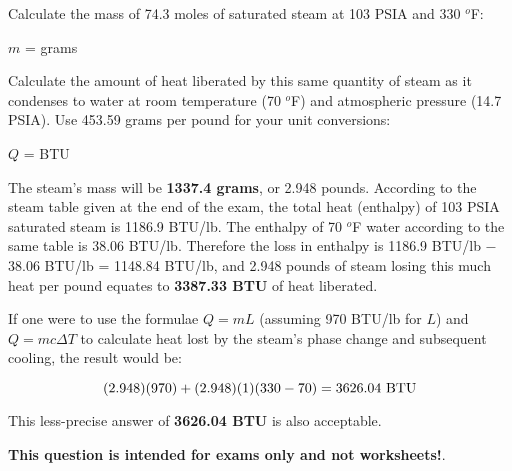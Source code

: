 

Calculate the mass of 74.3 moles of saturated steam at 103 PSIA and 330 $^{o}$F:

\vskip 10pt

$m$ = \underbar{\hskip 50pt} grams

\vskip 20pt

Calculate the amount of heat liberated by this same quantity of steam as it condenses to water at room temperature (70 $^{o}$F) and atmospheric pressure (14.7 PSIA).  Use 453.59 grams per pound for your unit conversions:

\vskip 10pt

$Q$ = \underbar{\hskip 50pt} BTU







The steam's mass will be {\bf 1337.4 grams}, or 2.948 pounds.  According to the steam table given at the end of the exam, the total heat (enthalpy) of 103 PSIA saturated steam is 1186.9 BTU/lb.  The enthalpy of 70 $^{o}$F water according to the same table is 38.06 BTU/lb.  Therefore the loss in enthalpy is 1186.9 BTU/lb $-$ 38.06 BTU/lb = 1148.84 BTU/lb, and 2.948 pounds of steam losing this much heat per pound equates to {\bf 3387.33 BTU} of heat liberated.  

\vskip 10pt

If one were to use the formulae $Q = mL$ (assuming 970 BTU/lb for $L$) and $Q = mc \Delta T$ to calculate heat lost by the steam's phase change and subsequent cooling, the result would be:

$$(2.948)(970) + (2.948)(1)(330 - 70) = 3626.04 \hbox{ BTU}$$

This less-precise answer of {\bf 3626.04 BTU} is also acceptable.







{\bf This question is intended for exams only and not worksheets!}.



